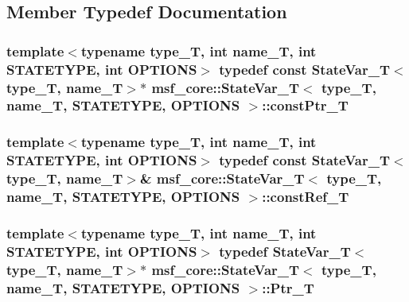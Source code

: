 \subsection{Member Typedef Documentation}
\hypertarget{structmsf__core_1_1StateVar__T_a0130c540891e011606bcd90e9bec6142}{
\subsubsection[{const\-Ptr\-\_\-\-T}]{\setlength{\rightskip}{0pt plus 5cm}template$<$typename type\-\_\-\-T, int name\-\_\-\-T, int S\-T\-A\-T\-E\-T\-Y\-P\-E, int O\-P\-T\-I\-O\-N\-S$>$ typedef const {\bf State\-Var\-\_\-\-T}$<$type\-\_\-\-T, name\-\_\-\-T$>$$\ast$ {\bf msf\-\_\-core\-::\-State\-Var\-\_\-\-T}$<$ type\-\_\-\-T, name\-\_\-\-T, S\-T\-A\-T\-E\-T\-Y\-P\-E, O\-P\-T\-I\-O\-N\-S $>$\-::{\bf const\-Ptr\-\_\-\-T}}}\label{structmsf__core_1_1StateVar__T_a0130c540891e011606bcd90e9bec6142}
\hypertarget{structmsf__core_1_1StateVar__T_aebeaee6c5d4290fae59c3d19bf98db38}{
\subsubsection[{const\-Ref\-\_\-\-T}]{\setlength{\rightskip}{0pt plus 5cm}template$<$typename type\-\_\-\-T, int name\-\_\-\-T, int S\-T\-A\-T\-E\-T\-Y\-P\-E, int O\-P\-T\-I\-O\-N\-S$>$ typedef const {\bf State\-Var\-\_\-\-T}$<$type\-\_\-\-T, name\-\_\-\-T$>$\& {\bf msf\-\_\-core\-::\-State\-Var\-\_\-\-T}$<$ type\-\_\-\-T, name\-\_\-\-T, S\-T\-A\-T\-E\-T\-Y\-P\-E, O\-P\-T\-I\-O\-N\-S $>$\-::{\bf const\-Ref\-\_\-\-T}}}\label{structmsf__core_1_1StateVar__T_aebeaee6c5d4290fae59c3d19bf98db38}
\hypertarget{structmsf__core_1_1StateVar__T_a735b254ba24acec4b93ec43253862ab9}{
\subsubsection[{Ptr\-\_\-\-T}]{\setlength{\rightskip}{0pt plus 5cm}template$<$typename type\-\_\-\-T, int name\-\_\-\-T, int S\-T\-A\-T\-E\-T\-Y\-P\-E, int O\-P\-T\-I\-O\-N\-S$>$ typedef {\bf State\-Var\-\_\-\-T}$<$type\-\_\-\-T, name\-\_\-\-T$>$$\ast$ {\bf msf\-\_\-core\-::\-State\-Var\-\_\-\-T}$<$ type\-\_\-\-T, name\-\_\-\-T, S\-T\-A\-T\-E\-T\-Y\-P\-E, O\-P\-T\-I\-O\-N\-S $>$\-::{\bf Ptr\-\_\-\-T}}}\label{structmsf__core_1_1StateVar__T_a735b254ba24acec4b93ec43253862ab9}
